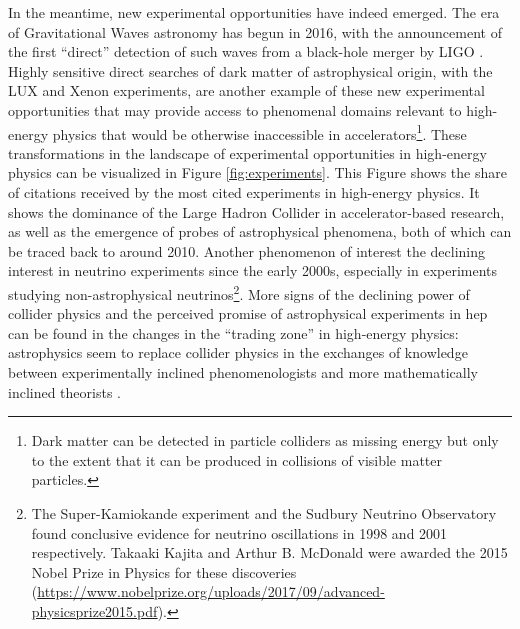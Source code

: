 \documentclass{article}
\begin{document}
In the meantime, new experimental opportunities have indeed emerged. The era of Gravitational Waves astronomy has begun in 2016, with the announcement of the first ``direct'' detection of such waves from a black-hole merger by LIGO \citep{Abbott2016}. Highly sensitive direct searches of dark matter of astrophysical origin, with the LUX and Xenon experiments, are another example of these new experimental opportunities that may provide access to phenomenal domains relevant to high-energy physics that would be otherwise inaccessible in accelerators\footnote{Dark matter can be detected in particle colliders as missing energy but only to the extent that it can be produced in collisions of visible matter particles.}. These transformations in the landscape of experimental opportunities in high-energy physics can be visualized in Figure \ref{fig:experiments}. This Figure shows the share of citations received by the most cited experiments in high-energy physics. It shows the dominance of the Large Hadron Collider in accelerator-based research, as well as the emergence of probes of astrophysical phenomena, both of which can be traced back to around 2010. Another phenomenon of interest the declining interest in neutrino experiments since the early 2000s, especially in experiments studying non-astrophysical neutrinos\footnote{The Super-Kamiokande experiment and the Sudbury Neutrino Observatory found conclusive evidence for neutrino oscillations in 1998 and 2001 respectively. Takaaki Kajita and Arthur B. McDonald were awarded the 2015 Nobel Prize in Physics for these discoveries (\url{https://www.nobelprize.org/uploads/2017/09/advanced-physicsprize2015.pdf}).}. More signs of the declining power of collider physics and the perceived promise of astrophysical experiments in \gls{hep} can be found in the changes in the ``trading zone'' in high-energy physics: astrophysics seem to replace collider physics in the exchanges of knowledge between experimentally inclined phenomenologists and more mathematically inclined theorists \citep{Gautheron2023}.
\end{document}

